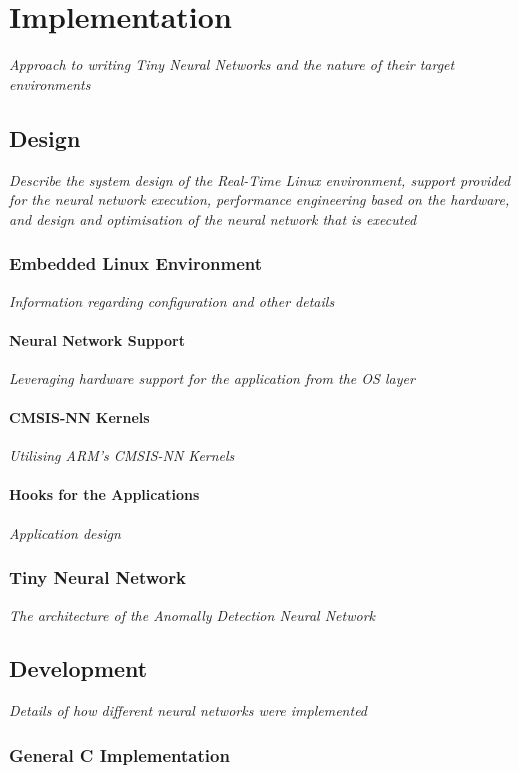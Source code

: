 \part{Implementation}

\textit{Approach to writing Tiny Neural Networks and the nature of their target environments}

\chapter{Design}
\textit{Describe the system design of the Real-Time Linux environment, support provided for the neural network execution, performance engineering based on the hardware, and design and optimisation of the neural network that is executed}

\section[Embedded Operating System]{Embedded Linux Environment}
\textit{Information regarding configuration and other details}

\subsection{Neural Network Support}
\textit{Leveraging hardware support for the application from the OS layer}

\subsection{CMSIS-NN Kernels}
\textit{Utilising ARM's CMSIS-NN Kernels}

\subsection{Hooks for the Applications}
\textit{Application design}

\section{Tiny Neural Network}
\textit{The architecture of the Anomally Detection Neural Network}

\chapter{Development}
\textit{Details of how different neural networks were implemented}

\section{General C Implementation}
\textit{}


